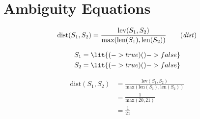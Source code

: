 \documentclass[11hpt]{article}
\newcommand{\ruletag}[1]{
  \tag{\emph{#1}}
}
\begin{document}
\section{Ambiguity Equations}

\begin{equation}
  \text{dist}(S_1, S_2) = \frac{\text{lev}(S_1, S_2)}{\text{max}(\text{len}(S_1), \text{len}(S_2))}
  \ruletag{dist}
\end{equation}

\begin{align*}
  S_1 &= \lit{(-> true)() -> false} \\
  S_2 &= \lit{(-> true) () -> false}
\end{align*}

\begin{align*}
  \text{dist}(S_1, S_2) &= \frac{\text{lev}(S_1, S_2)}{\text{max}(\text{len}(S_1), \text{len}(S_2))} \\
               &= \frac{1}{\text{max}(20, 21)} \\
               &= \frac{1}{21}
\end{align*}
\end{document}
